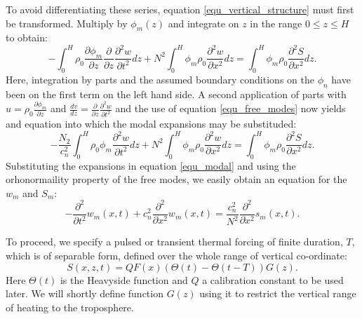 \documentclass[a4paper,10pt]{article}
\newcommand{\heavi}{\Theta}
\begin{document}
%
To avoid differentiating these series, equation \ref{equ_vertical_structure} must first be transformed. 
Multiply by $\phi_m(z)$ and integrate on $z$ in the range $0\leq z\leq H$ to obtain:
%
\begin{equation}
- \int_0^H  \rho_0 \frac{\partial \phi_m}{\partial z}  \frac{\partial}{\partial z} \frac{\partial^2 w}{\partial t^2}  dz  + N^2  \int_0^H \phi_m \rho_0 \frac{\partial^2 w}{\partial x^2} dz  = \int_0^H  \phi_m \rho_0 \frac{\partial^2 S}{\partial x^2} dz.
\end{equation}
%
Here, integration by parts and the assumed boundary conditions on the $\phi_n$ have been on the first term on the left hand side. A second application of parts with
$u= \rho_0 \frac{\partial \phi_m}{\partial z} $ and $\frac{dv}{dz} = \frac{\partial}{\partial z} \frac{\partial^2 w}{\partial t^2} $ and the use of equation \ref{equ_free_modes} 
now yields and equation into which the modal expansions may be substituded:
%
\begin{equation}
- \frac{N_2}{c_n^2} \int_0^H  \rho_0 \phi_m \frac{\partial^2 w}{\partial t^2}  dz  + N^2  \int_0^H \phi_m \rho_0 \frac{\partial^2 w}{\partial x^2} dz  = \int_0^H  \phi_m \rho_0 \frac{\partial^2 S}{\partial x^2} dz.
\end{equation}
%
Substituting the expansions in equation \ref{equ_modal} and using the orhonormaility property of the free modes, we easily obtain an equation for the $w_m$ and $S_m$:
%
\begin{equation}
-  \frac{\partial^2 }{\partial t^2} w_m(x,t)  + c_n^2   \frac{\partial^2 }{\partial x^2} w_m(x,t)   =  \frac{c_n^2 }{N^2} \frac{\partial^2 }{\partial x^2} s_m(x,t).
\end{equation}
%

To proceed, we specify a pulsed or transient thermal forcing of finite duration, $T$, which is of separable form, 
defined over the whole range of vertical co-ordinate:
%
\begin{equation}
\label{equ_heating}
S(x,z,t) = Q F(x) \left( \heavi(t) - \heavi(t-T) \right) G(z).
\end{equation}
%
Here $\heavi(t)$ is the Heavyside function and $Q$ a calibration constant to be used later. We will shortly define function $G(z)$
using it to restrict the vertical range of heating to the troposphere.
%
%
%
\end{document}
